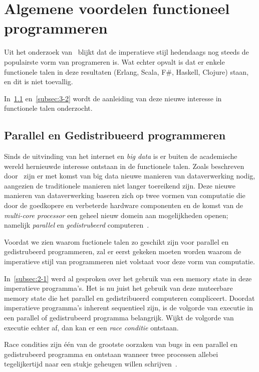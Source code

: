 \documentclass[twoside,twocolumn]{article}
\begin{document}
\section{Algemene voordelen functioneel programmeren}
\label{sec:3}

Uit het onderzoek van~\textcites{src7}{src8} blijkt dat de imperatieve stijl
hedendaags nog steeds de populairste vorm van programeren is. Wat echter opvalt
is dat er enkele functionele talen in deze resultaten (Erlang, Scala, F#,
Haskell, Clojure) staan, en dit is niet toevallig.

In~\cref{subsec:3-1} en~\cref{subsec:3-2} wordt de aanleiding van deze nieuwe
interesse in functionele talen onderzocht.

\subsection{Parallel en Gedistribueerd programmeren}
\label{subsec:3-1}

Sinds de uitvinding van het internet en \textit{big data} is er buiten de
academische wereld hernieuwde interesse ontstaan in de functionele talen.
Zoals beschreven door~\textcite{src10} zijn er met komst van big data
nieuwe manieren van dataverwerking nodig, aangezien de traditionele manieren
niet langer toereikend zijn. Deze nieuwe manieren van dataverwerking baseren
zich op twee vormen van computatie die door de goedkopere en verbeterde
hardware componenten en de komst van de \textit{multi-core processor} een
geheel nieuw domein aan mogelijkheden openen; namelijk \textit{parallel} en
\textit{gedistrubeerd} computeren~\cite{src10,src11}.

Voordat we zien waarom fuctionele talen zo geschikt zijn voor parallel en
gedistrubeerd programmeren, zal er eerst gekeken moeten worden waarom de
imperatieve stijl van programmeren niet volstaat voor deze vorm van computatie.

In~\cref{subsec:2-1} werd al gesproken over het gebruik van een memory state in
deze imperatieve programma's. Het is nu juist het gebruik van deze muteerbare
memory state die het parallel en gedistribueerd computeren compliceert. Doordat
imperatieve programma's inherent sequentieel zijn, is de volgorde van executie
in een parallel of gedistrubeerd programma belangrijk. Wijkt de volgorde van
executie echter af, dan kan er een \textit{race conditie} ontstaan.

Race condities zijn \'e\'en van de grootste oorzaken van bugs in een parallel
en gedistrubeerd programma en ontstaan wanneer twee processen allebei
tegelijkertijd naar een stukje geheugen willen schrijven~\cite{src1}.
\end{document}
